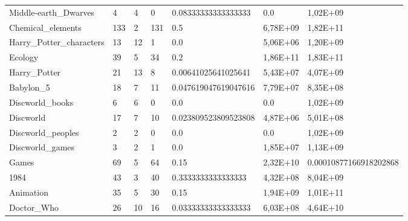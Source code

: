 \begin{longtable}{@{}lllllll@{}}
Middle-earth\_Dwarves & 4 & 4 & 0 & 0.08333333333333333 & 0.0 & 1,02E+09 \\
Chemical\_elements & 133 & 2 & 131 & 0.5 & 6,78E+09 & 1,82E+11 \\
Harry\_Potter\_characters & 13 & 12 & 1 & 0.0 & 5,06E+06 & 1,20E+09 \\
Ecology & 39 & 5 & 34 & 0.2 & 1,86E+11 & 1,83E+11 \\
Harry\_Potter & 21 & 13 & 8 & 0.00641025641025641 & 5,43E+07 & 4,07E+09 \\
Babylon\_5 & 18 & 7 & 11 & 0.047619047619047616 & 7,79E+07 & 8,35E+08 \\
Discworld\_books & 6 & 6 & 0 & 0.0 & 0.0 & 1,02E+09 \\
Discworld & 17 & 7 & 10 & 0.023809523809523808 & 4,87E+06 & 5,01E+08 \\
Discworld\_peoples & 2 & 2 & 0 & 0.0 & 0.0 & 1,02E+09 \\
Discworld\_games & 3 & 2 & 1 & 0.0 & 1,85E+07 & 1,13E+09 \\
Games & 69 & 5 & 64 & 0.15 & 2,32E+10 & 0.00010877166918202868 \\
1984 & 43 & 3 & 40 & 0.3333333333333333 & 4,32E+08 & 8,04E+09 \\
Animation & 35 & 5 & 30 & 0.15 & 1,94E+09 & 1,01E+11 \\
Doctor\_Who & 26 & 10 & 16 & 0.03333333333333333 & 6,03E+08 & 4,64E+10 \\* \bottomrule
\end{longtable}